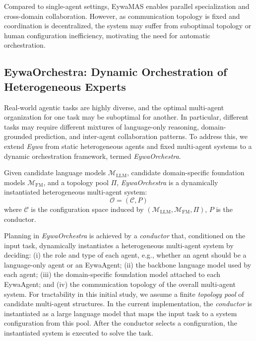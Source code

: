 \documentclass{llmxive}
\begin{document}
{Compared to single-agent settings, EywaMAS enables parallel specialization and cross-domain collaboration. However, as communication topology is fixed and coordination is decentralized, the system may suffer from suboptimal topology or human configuration inefficiency, motivating the need for automatic orchestration.


\subsection{EywaOrchestra: Dynamic Orchestration of Heterogeneous Experts}

Real-world agentic tasks are highly diverse, and the optimal multi-agent organization for one task may be suboptimal for another. In particular, different tasks may require different mixtures of language-only reasoning, domain-grounded prediction, and inter-agent collaboration patterns. To address this, we extend \textit{Eywa} from static heterogeneous agents and fixed multi-agent systems to a dynamic orchestration framework, termed \textit{EywaOrchestra}.

\begin{tcolorbox}[
  agentscope,
  float,
  floatplacement=h,
  title=\textbf{EywaOrchestra}
]
\begin{definition}[EywaOrchestra]
\label{def:eywaorchestra}
Given candidate language models $\mathcal{M}_{\mathrm{LLM}}$, candidate domain-specific foundation models $\mathcal{M}_{\mathrm{FM}}$, and a topology pool $\Pi$, \textit{EywaOrchestra} is a dynamically instantiated heterogeneous multi-agent system:
\begin{equation}
\mathcal{O} = (\mathcal{C}, P)
\end{equation}
where $\mathcal{C}$ is the configuration space induced by $(\mathcal{M}_{\mathrm{LLM}}, \mathcal{M}_{\mathrm{FM}}, \Pi)$, $P$ is the conductor.
\end{definition}
\end{tcolorbox}

Planning in \textit{EywaOrchestra} is achieved by a \emph{conductor} that, conditioned on the input task, dynamically instantiates a heterogeneous multi-agent system by deciding: 
(i) the role and type of each agent, e.g., whether an agent should be a language-only agent or an EywaAgent;
(ii) the backbone language model used by each agent;
(iii) the domain-specific foundation model attached to each EywaAgent; and
(iv) the communication topology of the overall multi-agent system.
For tractability in this initial study, we assume a finite \emph{topology pool} of candidate multi-agent structures. In the current implementation, the \emph{conductor} is instantiated as a large language model that maps the input task to a system configuration from this pool. After the conductor selects a configuration, the instantiated system is executed to solve the task.


}
\end{document}
